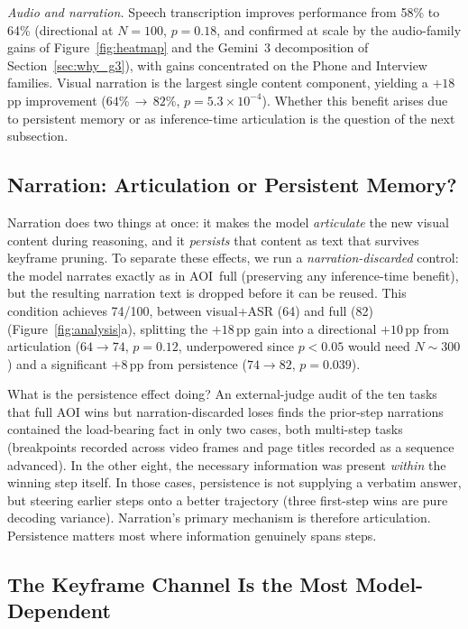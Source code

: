 \documentclass[11pt]{article}
\begin{document}
\emph{Audio and narration.}
Speech transcription improves performance from 58\% to 64\% (directional at $N{=}100$, $p=0.18$,
and confirmed at scale by the audio-family gains of Figure~\ref{fig:heatmap} and the
Gemini~3 decomposition of Section~\ref{sec:why_g3}), with gains concentrated on the Phone
and Interview families.
Visual narration is the largest single content component, yielding a $+18$\,pp improvement
($64\%\,{\to}\,82\%$, $p=5.3\times10^{-4}$). Whether this benefit arises due to persistent memory
or as inference-time articulation is the question of the next subsection.

\subsection{Narration: Articulation or Persistent Memory?}
\label{sec:narration_discard}



Narration does two things at once: it makes the model \emph{articulate} the new
visual content during reasoning, and it \emph{persists} that content as text that survives
keyframe pruning.
To separate these effects, we run a \emph{narration-discarded} control: the model narrates
exactly as in AOI~full (preserving any inference-time benefit), but the resulting narration
text is dropped before it can be reused.
This condition achieves 74/100, between visual+ASR (64) and full (82)
(Figure~\ref{fig:analysis}a), splitting the $+18$\,pp gain into a directional
$+10$\,pp from articulation ($64\to74$, $p=0.12$, underpowered since $p<0.05$ would
need $N\!\sim\!300$) and a significant $+8$\,pp from persistence
($74\to82$, $p=0.039$).

What is the persistence effect doing?
An external-judge audit of the ten tasks that full AOI wins but narration-discarded
loses finds the prior-step narrations contained the load-bearing fact in
only two cases, both multi-step tasks (breakpoints recorded across video frames
and page titles recorded as a sequence advanced).
In the other eight, the necessary information was present \emph{within} the winning
step itself. In those cases, persistence is not supplying a verbatim answer, but steering
earlier steps onto a better trajectory (three first-step wins are pure decoding
variance).
Narration's primary mechanism is therefore articulation. Persistence matters most
where information genuinely spans steps.

\subsection{The Keyframe Channel Is the Most Model-Dependent}
\label{sec:keyframe_context}
\end{document}
